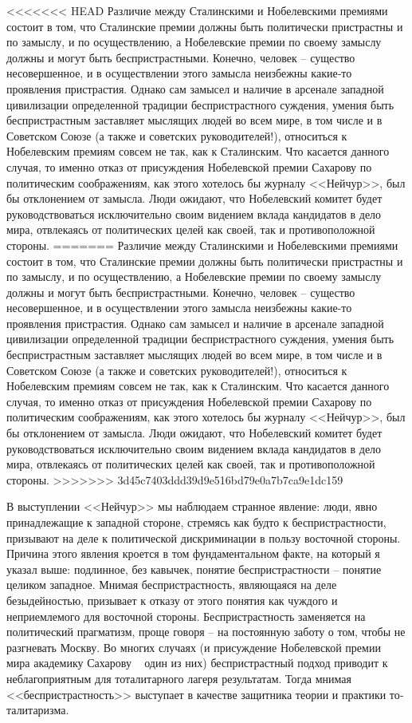 \documentclass{book}
\begin{document}
{<<<<<<< HEAD
Различие между Сталинскими и Нобелевскими премиями состоит в том, что Сталинские премии должны быть политически пристрастны и по замыслу, и по осуществлению, а Нобелевские премии по своему замыслу должны и могут быть беспристрастными. Конечно, человек -- существо несовершенное, и в осуществлении этого замысла неизбежны какие‑то проявления пристрастия. Однако сам замысел и наличие в арсенале западной цивилизации определенной традиции беспристрастного суждения, умения быть беспристрастным заставляет мыслящих людей во всем мире, в том числе и в Советском Союзе (а также и советских руководителей!), относиться к Нобелевским премиям совсем не так, как к Сталинским. Что ка­сается данного случая, то именно отказ от присуждения Нобе­левской премии Сахарову по политическим соображениям, как этого хотелось бы журналу <<Нейчур>>, был бы отклонением от замысла. Люди ожидают, что Нобелевский комитет будет руководствоваться исключительно своим видением вклада кандидатов в дело мира, отвлекаясь от политических целей как своей, так и противоположной стороны.
=======
Различие между Сталинскими и Нобелевскими премиями состоит в том, что Сталинские премии должны быть политически пристрастны и по замыслу, и по осуществлению, а Нобелевские премии по своему замыслу должны и могут быть беспристрастными. Конечно, человек -- существо несовершенное, и в осуществлении этого замысла неизбежны какие-то проявления пристрастия. Однако сам замысел и наличие в арсенале западной цивилизации определенной традиции беспристрастного суждения, умения быть беспристрастным заставляет мыслящих людей во всем мире, в том числе и в Советском Союзе (а также и советских руководителей!), относиться к Нобелевским премиям совсем не так, как к Сталинским. Что ка­сается данного случая, то именно отказ от присуждения Нобе­левской премии Сахарову по политическим соображениям, как этого хотелось бы журналу <<Нейчур>>, был бы отклонением от замысла. Люди ожидают, что Нобелевский комитет будет руководствоваться исключительно своим видением вклада кандидатов в дело мира, отвлекаясь от политических целей как своей,
 так и противоположной стороны.
>>>>>>> 3d45c7403ddd39d9e516bd79e0a7b7ca9e1dc159

В выступлении <<Нейчур>> мы наблюдаем странное явление: люди, явно принадлежащие к западной стороне, стремясь как будто к беспристрастности, призывают на деле к политиче­ской дискриминации в пользу восточной стороны. Причина этого явления кроется в том фундаментальном факте, на кото­рый я указал выше: подлинное, без кавычек, понятие бесприст­растности -- понятие целиком западное. Мнимая беспристраст­ность, являющаяся на деле безыдейностью, призывает к отказу от этого понятия как чуждого и неприемлемого для восточной стороны. Беспристрастность заменяется на политический праг­матизм, проще говоря -- на постоянную заботу о том, чтобы не разгневать Москву. Во многих случаях (и присуждение Но­белевской премии мира академику Сахарову ~ один из них) беспристрастный подход приводит к неблагоприятным для тоталитарного лагеря результатам. Тогда мнимая <<беспристраст­ность>> выступает в качестве защитника теории и практики то­талитаризма.

}
\end{document}

